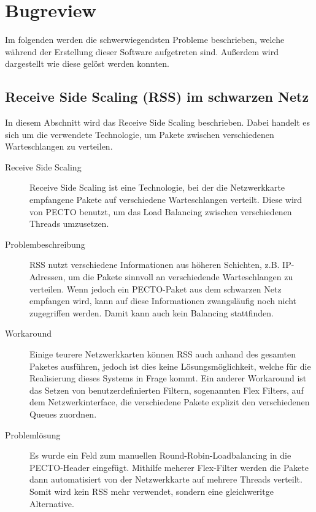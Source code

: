 \section{Bugreview}
Im folgenden werden die schwerwiegendsten Probleme beschrieben, welche während der Erstellung dieser Software aufgetreten sind. 
Außerdem wird dargestellt wie diese gelöst werden konnten.

\subsection{Receive Side Scaling (RSS) im schwarzen Netz}
In diesem Abschnitt wird das Receive Side Scaling beschrieben.
Dabei handelt es sich um die verwendete Technologie, um Pakete zwischen verschiedenen Warteschlangen zu verteilen.

\begin{description}
	
	\item[Receive Side Scaling] 
	Receive Side Scaling ist eine Technologie, bei der die Netzwerkkarte empfangene Pakete auf verschiedene Warteschlangen verteilt.
	Diese wird von PECTO benutzt, um das Load Balancing zwischen verschiedenen Threads umzusetzen.
	
	\item[Problembeschreibung]
	RSS nutzt verschiedene Informationen aus höheren Schichten, z.B. IP-Adressen, um die Pakete sinnvoll an verschiedende Warteschlangen zu verteilen. 
	Wenn jedoch ein PECTO-Paket aus dem schwarzen Netz empfangen wird, kann auf diese Informationen zwangsläufig noch nicht zugegriffen werden.
	Damit kann auch kein Balancing stattfinden.
	
	\item[Workaround]
	Einige teurere Netzwerkkarten können RSS auch anhand des gesamten Paketes ausführen, jedoch ist dies keine Lösungsmöglichkeit, welche für die Realisierung dieses Systems in Frage kommt.
	Ein anderer Workaround ist das Setzen von benutzerdefinierten Filtern, sogenannten Flex Filters, auf dem Netzwerkinterface, die verschiedene Pakete explizit den verschiedenen Queues zuordnen.
	
	\item[Problemlösung]
	Es wurde ein Feld zum manuellen Round-Robin-Loadbalancing in die PECTO-Header eingefügt. 
	Mithilfe meherer Flex-Filter werden die Pakete dann automatisiert von der Netzwerkkarte auf mehrere Threads verteilt.
	Somit wird kein RSS mehr verwendet, sondern eine gleichweritge Alternative.
	 
\end{description}
